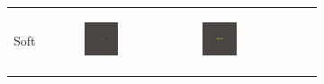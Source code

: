 \documentclass[conference]{IEEEtran}
\newlength{\subfigwidth}
\begin{document}
\begin{figure}
\begin{subfigure}[b]{\textwidth}
\begin{tabular}{r M{\subfigwidth} M{\subfigwidth} M{\subfigwidth} M{\subfigwidth} M{\subfigwidth} }
            Soft                                                                                    &
            \begin{subfigure}[b]{\subfigwidth}
                \includegraphics[width=\textwidth]{figures/growth_comparison_lambda_1e-2/soft.0020.png}
            \end{subfigure} &
            \begin{subfigure}[b]{\subfigwidth}
                \includegraphics[width=\textwidth]{figures/growth_comparison_lambda_1e-2/soft.0040.png}

\end{subfigure}
\end{tabular}
\end{subfigure}
\end{figure}
\end{document}
